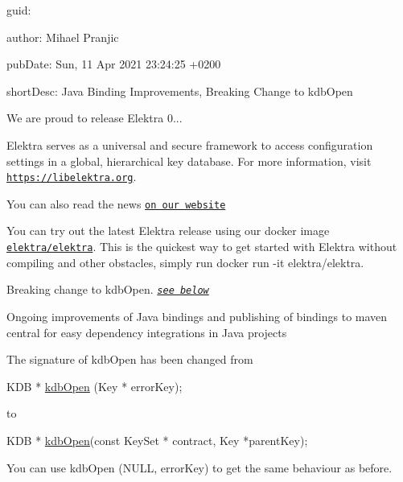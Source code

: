 
\begin{DoxyItemize}
\item guid\+:
\item author\+: Mihael Pranjic
\item pub\+Date\+: Sun, 11 Apr 2021 23\+:24\+:25 +0200
\item short\+Desc\+: Java Binding Improvements, Breaking Change to {\ttfamily kdb\+Open}
\end{DoxyItemize}

We are proud to release Elektra 0...

Elektra serves as a universal and secure framework to access configuration settings in a global, hierarchical key database. For more information, visit \href{https://libelektra.org}{\tt https\+://libelektra.\+org}.

You can also read the news \href{https://www.libelektra.org/news/0.9.<<VERSION>>-release}{\tt on our website}

You can try out the latest Elektra release using our docker image \href{https://hub.docker.com/r/elektra/elektra}{\tt elektra/elektra}. This is the quickest way to get started with Elektra without compiling and other obstacles, simply run {\ttfamily docker run -\/it elektra/elektra}.


\begin{DoxyItemize}
\item Breaking change to {\ttfamily kdb\+Open}. {\itshape \href{#hl-1}{\tt see below}}
\item Ongoing improvements of Java bindings and publishing of bindings to maven central for easy dependency integrations in Java projects
\end{DoxyItemize}

The signature of {\ttfamily kdb\+Open} has been changed from


\begin{DoxyCode}
KDB *  \hyperlink{group__kdb_ga844e1299a84c3fbf1d3a905c5c893ba5}{kdbOpen} (Key * errorKey);
\end{DoxyCode}


to


\begin{DoxyCode}
KDB * \hyperlink{group__kdb_ga844e1299a84c3fbf1d3a905c5c893ba5}{kdbOpen}(\textcolor{keyword}{const} KeySet * contract, Key *parentKey);
\end{DoxyCode}


You can use {\ttfamily kdb\+Open (N\+U\+LL, error\+Key)} to get the same behaviour as before.

